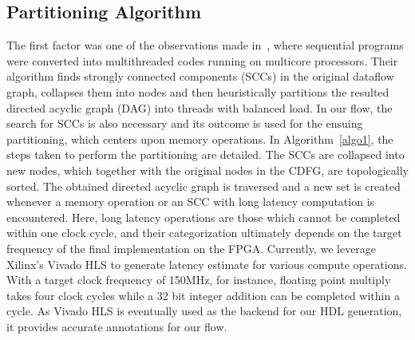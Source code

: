 \begin{algorithm}[t]
\begin{algorithmic}[1]
  
  
  \end{algorithmic}
\end{algorithm}

\subsection{Partitioning Algorithm}
The first factor was one of the observations made 
in~\cite{dswp}, where sequential programs were converted into multithreaded
codes running on multicore processors. Their algorithm
finds strongly connected components (SCCs) in the
original dataflow graph, collapses them into nodes and then
heuristically partitions the resulted directed acyclic graph
(DAG) into threads with balanced load. In our flow, the search
for SCCs is also necessary and its outcome is used for the
ensuing partitioning, which centers upon memory operations.
In Algorithm~\ref{algo1}, the steps taken to perform the partitioning are detailed.
The SCCs are collapsed into new nodes, which together with the original nodes in the CDFG, are topologically
sorted. The obtained directed acyclic graph is traversed and a new set is created whenever a memory operation
or an SCC with long latency computation
is encountered. Here, long latency operations are those which cannot be completed within
one clock cycle, and
their categorization ultimately depends on the target frequency
of the final implementation on the FPGA. Currently, we
leverage Xilinx’s Vivado HLS to generate latency estimate for
various compute operations. With a target clock frequency of
150MHz, for instance, floating point multiply takes four clock
cycles while a 32 bit integer addition can be completed within
a cycle. As Vivado HLS is eventually used as the backend for
our HDL generation, it provides accurate annotations for our
flow.
